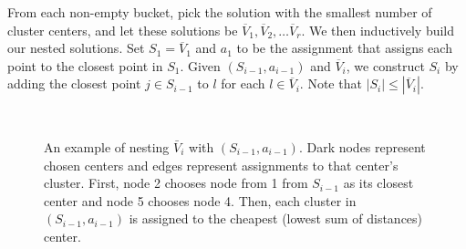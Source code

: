 \documentclass[conference, 10pt, final]{IEEEtran}
\begin{document}
From each non-empty bucket, pick the solution with the smallest number of cluster centers, and let these solutions be $\overline{V}_1, \overline{V}_2, \ldots \overline{V}_r$. We then inductively build our nested solutions. Set $S_1 = \overline{V}_1$ and $a_1$ to be the assignment that assigns each point to the closest point in $S_1$. Given $(S_{i-1}, a_{i-1})$ and $\overline{V}_i$, we construct $S_i$ by  adding the closest point $j \in S_{i-1}$ to $l$ for each $l \in \overline{V}_i$. Note that $|S_{i}| \leq |\overline{V}_i|$. 

\begin{figure}[!t]
\centering
{} \hspace{15mm}
 \\
  \hspace{15mm}
\caption{An example of nesting $\bar{V}_i$ with $(S_{i-1}, a_{i-1})$. Dark  nodes represent chosen centers and edges represent assignments to that center's cluster. First, node 2 chooses node from 1 from $S_{i-1}$ as its closest center and node 5 chooses node 4. Then, each cluster in $(S_{i-1}, a_{i-1})$ is assigned to the cheapest (lowest sum of distances) center.}
\label{fig_sim}
\end{figure}
\end{document}
